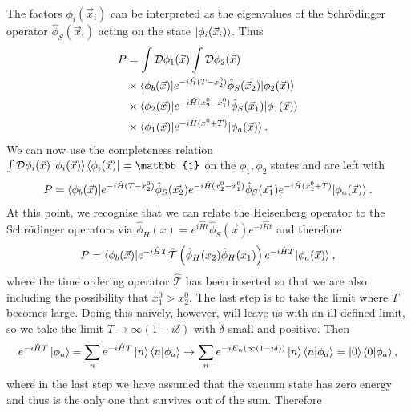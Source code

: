 The factors $\phi_i (\vec{x}_i)$ can be interpreted as the eigenvalues of the Schr\"odinger operator $\hat{\phi}_S (\vec{x}_i)$ acting on the state $\mathinner{\lvert\phi_i(\vec{x}_i)\rangle}_{\hspace{-0.1em}}$. Thus
\begin{equation}
\begin{split}
P &= \int \mathcal{D} \phi_1(\vec{x}) \int \mathcal{D} \phi_2(\vec{x})  \\
& \times \mathinner{\langle\phi_b(\vec{x})\vert e^{-i \hat{H} (T - x_2^0)} \hat{\phi}_S (\vec{x}_2)\vert\phi_2(\vec{x})\rangle}_{} \\
& \times \mathinner{\langle\phi_2(\vec{x})\vert e^{-i \hat{H} (x_2^0 - x_1^0)} \hat{\phi}_S (\vec{x}_1)\vert\phi_1(\vec{x})\rangle}_{} \\
&\times \mathinner{\langle\phi_1(\vec{x})\vert e^{-i \hat{H} (x_1^0+T)}\vert\phi_a(\vec{x})\rangle}_{}.
\end{split}
\end{equation}
We can now use the completeness relation $\int \mathcal{D} \phi_i(\vec{x}) \ket{\phi_i(\vec{x})} \bra{\phi_i(\vec{x})} = \mathbb{1}$ on the $\phi_1, \phi_2$ states and are left with
\begin{equation}
P = \mathinner{\langle\phi_b(\vec{x})\vert e^{-i \hat{H}(T - x_2^0)} \hat{\phi}_S(\vec{x_2}) e^{-i\hat{H}(x_2^0 - x_1^0)} \hat{\phi}_S(\vec{x_1}) e^{-i \hat{H}(x_1^0 + T)}\vert\phi_a(\vec{x})\rangle}_{}.
\end{equation}
At this point, we recognise that we can relate the Heisenberg operator to the Schr\"odinger operators via $\hat{\phi}_H(x) = e^{i \hat{H} t} \hat{\phi}_S(\vec{x}) e^{-i \hat{H} t}$ and therefore
\begin{equation}
P = \mathinner{\langle\phi_b(\vec{x})\vert e^{- i \hat{H} T} \hat{\mathcal{T}} \left(\hat{\phi}_H(x_2) \hat{\phi}_H(x_1) \right) e^{-i \hat{H} T}\vert\phi_a(\vec{x})\rangle}_{},
\end{equation}
where the time ordering operator $\hat{\mathcal{T}}$ has been inserted so that we are also including the possibility that $x_1^0 > x_2^0$. The last step is to take the limit where $T$ becomes large. Doing this naively, however, will leave us with an ill-defined limit, so we take the limit $T \to \infty(1- i \delta)$ with $\delta$ small and positive. Then
\begin{equation}
e^{-i \hat{H} T} \mathinner{\lvert\phi_a\rangle}_{\hspace{-0.1em}} = \sum_n e^{-i \hat{H} T} \mathinner{\lvert n\rangle}_{\hspace{-0.1em}} \left<n | \phi_a \right> \to \sum_n e^{-i E_n (\infty(1 - i \delta))}\mathinner{\lvert n\rangle}_{\hspace{-0.1em}} \left<n | \phi_a \right> = \mathinner{\lvert0\rangle}_{\hspace{-0.1em}} \left<0 | \phi_a \right>,
\end{equation}
where in the last step we have assumed that the vacuum state has zero energy and thus is the only one that survives out of the sum. Therefore
